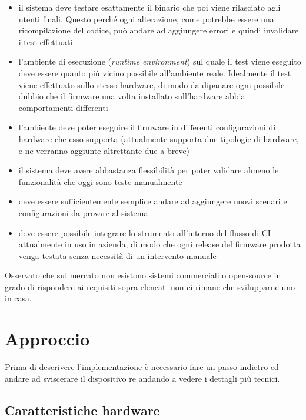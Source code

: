 \documentclass[12pt,a4paper,twoside,titlepage]{book}
\begin{document}
\begin{itemize}
    \item il sistema deve testare esattamente il binario che poi viene rilasciato agli utenti finali.
        Questo perché ogni alterazione, come potrebbe essere una ricompilazione del codice, può andare
        ad aggiungere errori e quindi invalidare i test effettuati
    \item l'ambiente di esecuzione (\textit{runtime environment}) sul quale il test viene eseguito deve essere quanto
        più vicino possibile all'ambiente reale. Idealmente il test viene effettuato sullo stesso hardware,
        di modo da dipanare ogni possibile dubbio che il \gls{firmware} una volta installato sull'hardware abbia
        comportamenti differenti
    \item l'ambiente deve poter eseguire il \gls{firmware} in differenti configurazioni di hardware che esso supporta
        (attualmente supporta due tipologie di hardware, e ne verranno aggiunte altrettante due a breve)
    \item il sistema deve avere abbastanza flessibilità per poter validare almeno le funzionalità che oggi
        sono teste manualmente
    \item deve essere sufficientemente semplice andare ad aggiungere nuovi scenari e configurazioni da provare al sistema
    \item deve essere possibile integrare lo strumento all'interno del flusso di CI attualmente in
        uso in azienda, di modo che ogni release del \gls{firmware} prodotta venga testata senza necessità di
        un intervento manuale
\end{itemize}

Osservato che sul mercato non esistono sistemi commerciali o open-source in grado di rispondere ai requisiti 
sopra elencati non ci rimane che svilupparne uno in casa. 

\chapter{Approccio}

Prima di descrivere l'implementazione è necessario fare un passo indietro ed andare
ad sviscerare il dispositivo \Gls{re} andando a vedere i dettagli più tecnici.

\section{Caratteristiche hardware}
\end{document}

